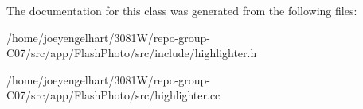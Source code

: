The documentation for this class was generated from the following files\+:\begin{DoxyCompactItemize}
\item 
/home/joeyengelhart/3081\+W/repo-\/group-\/\+C07/src/app/\+Flash\+Photo/src/include/highlighter.\+h\item 
/home/joeyengelhart/3081\+W/repo-\/group-\/\+C07/src/app/\+Flash\+Photo/src/highlighter.\+cc\end{DoxyCompactItemize}
